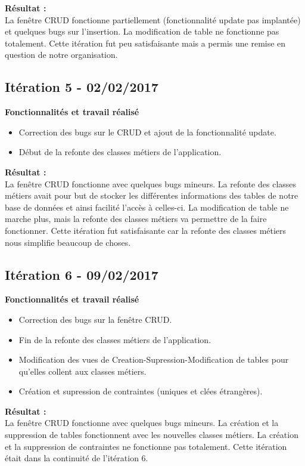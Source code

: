 \textbf{Résultat :}\\
La fenêtre CRUD fonctionne partiellement (fonctionnalité update pas implantée) et quelques bugs sur l'insertion. 
La modification de table ne fonctionne pas totalement.
Cette itération fut peu satisfaisante mais a permis une remise en question de notre organisation. 

\subsection{Itération 5 - 02/02/2017}
\textbf{Fonctionnalités et travail réalisé}
\begin{itemize}
\item Correction des bugs sur le CRUD et ajout de la fonctionnalité update.
\item Début de la refonte des classes métiers de l'application.\\
\end{itemize}

\textbf{Résultat :}\\
La fenêtre CRUD fonctionne avec quelques bugs mineurs.
La refonte des classes métiers avait pour but de stocker les différentes informations des tables de notre base de données et ainsi facilité l'accès à celles-ci.
La modification de table ne marche plus, mais la refonte des classes métiers va permettre de la faire fonctionner.
Cette itération fut satisfaisante car la refonte des classes métiers nous simplifie beaucoup de choses. 

\subsection{Itération 6 - 09/02/2017}
\textbf{Fonctionnalités et travail réalisé}
\begin{itemize}
\item Correction des bugs sur la fenêtre CRUD.
\item Fin de la refonte des classes métiers de l'application.
\item Modification des vues de Creation-Supression-Modification de tables pour qu'elles collent aux classes métiers.
\item Création et supression de contraintes (uniques et clées étrangères).\\
\end{itemize}

\textbf{Résultat :}\\
La fenêtre CRUD fonctionne avec quelques bugs mineurs.
La création et la suppression de tables fonctionnent avec les nouvelles classes métiers.
La création et la suppression de contraintes ne fonctionne pas totalement.
Cette itération était dans la continuité de l'itération 6. 

